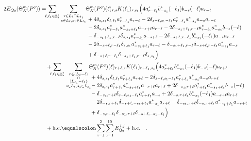 \documentclass[sn-mathphys, Numbered ,a4paper]{sn-jnl}%
\DeclareMathOperator{\Z}{\mathbb{Z}}
\theoremstyle{plain}
\theoremstyle{definition}
\theoremstyle{remark}
\theoremstyle{plain}
\theoremstyle{definition}
\theoremstyle{remark}
\begin{document}
\begin{alignat}{2}
	2E_{Q_2}(\Theta^m_{K}(P^q)) &=
	\!\!\!\sum\limits_{\ell,\ell_1 \in \Z^3_*}\sum\limits_{\substack{r\in L_{\ell} \cap L_{\ell_1}\\ s \in L_{\ell},s_1\in L_{\ell_1}}} \!\!\!\begin{aligned}[t] &\Theta^m_{K}(P^q)(\ell)_{r,s}K(\ell_1)_{r,s_1}\Big( 4a^*_{r-\ell_1}b^*_{-s_1}(-\ell_1)b_{-s}(-\ell)a_{r-\ell} \nonumber\\ 
		&\;+ 4\delta_{s,s_1} \delta_{\ell,\ell_1 } a^*_{r-\ell_1} a_{r-\ell} -2\delta_{s-\ell,s_1-\ell_1}a^*_{r-\ell_1} a^*_{-s_1} a_{-s} a_{r-\ell} \nonumber\\
		&\;-2\delta_{s,s_1}a^*_{r-\ell_1} a^*_{-s_1+\ell_1}a_{-s+\ell} a_{r-\ell} - 2\delta_{-s_1+\ell_1,r-\ell} a^*_{r-\ell_1} a^*_{-s_1} b_{-s}(-\ell)\nonumber\\
		&\;-\delta_{-s_1+\ell_1,r-\ell}\delta_{s,s_1}a^*_{r-\ell_1}a_{-s+\ell} - 2\delta_{-s+\ell,r-\ell_1}b^*_{-s_1}(-\ell_1)a_{-s}a_{r-\ell} \nonumber\\
		&\;-2\delta_{-s+\ell,r-\ell_1}\delta_{s,s_1}a^*_{-s_1+\ell_1} a_{r-\ell} - \delta_{-s_1+\ell_1,r-\ell}\delta_{-s+\ell,r-\ell_1}a^*_{-s_1}a_{-s} \nonumber\\
		&\;+\delta_{-s+\ell,r-\ell_1}\delta_{-s_1+\ell_1,r-\ell}\delta_{s,s_1}  \Big)    
	\end{aligned}\\
	&\quad +\!\!\!\sum\limits_{\ell,\ell_1 \in \Z^3_*}\sum\limits_{\substack{r\in (L_{\ell}-\ell)\\ \cap \\(L_{\ell_1}-\ell_1)\\ s \in L_{\ell},s_1\in L_{\ell_1}}}\!\!\!\!\!\begin{aligned}[t] &\Theta^m_{K}(P^q)(\ell)_{r+\ell,s}K(\ell_1)_{r+\ell_1,s_1}\Big(4a^*_{r+\ell_1}b^*_{-s_1}(-\ell_1)b_{-s}(-\ell)a_{r+\ell} \nonumber\\
		&\;+ 4\delta_{s,s_1} \delta_{\ell,\ell_1 } a^*_{r+\ell_1} a_{r+\ell} -2\delta_{s-\ell,s_1-\ell_1}a^*_{r+\ell_1} a^*_{-s_1} a_{-s} a_{r+\ell} \nonumber\\
		&\;-2\delta_{s,s_1}a^*_{r+\ell_1} a^*_{-s_1+\ell_1}a_{-s+\ell} a_{r+\ell} + 2 \delta_{-s_1, r+\ell}a^*_{r+\ell_1}a^*_{-s_1+\ell_1}b_{-s}(-\ell)\nonumber\\
		&\;-\delta_{-s_1,r+\ell}\delta_{s-\ell,s_1-\ell_1}a^*_{r+\ell_1}a_{-s} + 2\delta_{-s,r+\ell_1}b^*_{-s_1}(-\ell_1)a_{-s+\ell}a_{r+\ell} \nonumber\\
		&\;-2\delta_{-s,r+\ell_1}\delta_{-s+\ell,-s_1+\ell_1}a^*_{-s_1}a_{r+\ell} - \delta_{-s_1,r+\ell}\delta_{-s,r+\ell_1}a^*_{-s_1+\ell_1}a_{-s+\ell}\nonumber\\
		&\;+ \delta_{-s,r+\ell_1} \delta_{-s_1,r+\ell} \delta_{-s+\ell,-s_1+\ell_1} \Big)  
	\end{aligned}\\
	&\quad +\mathrm{h.c.} \equalscolon \sum\limits_{i=1}^{2}\sum\limits_{j=1}^{10} E_{Q_2}^{\,i,j} + \mathrm{h.c.} \label{eq:prelimEQ2} \quad.
\end{alignat}
\end{document}
